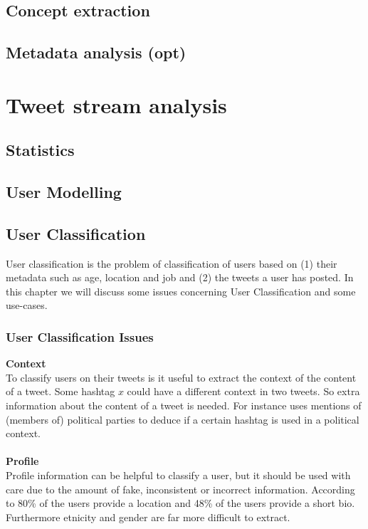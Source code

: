 \documentclass{article}
\begin{document}
\newpage
\subsection{Concept extraction}
\subsection{Metadata analysis (opt)}

\section{Tweet stream analysis}
\subsection{Statistics}
\subsection{User Modelling}
\subsection{User Classification}
User classification is the problem of classification of users based on (1) their metadata such as age, location and job and (2) the tweets a user has posted. In this chapter we will discuss some issues concerning User Classification and some use-cases. 

\subsubsection{User Classification Issues}
\textbf{Context}\\
To classify users on their tweets is it useful to extract the context of the content of a tweet. Some hashtag $x$ could have a different context in two tweets. So extra information about the content of a tweet is needed. For instance \cite{userclasst} uses mentions of (members of) political parties to deduce if a certain hashtag is used in a political context. 
\\\\
\textbf{Profile}\\
Profile information can be helpful to classify a user, but it should be used with care due to the amount of fake, inconsistent or incorrect information. According to \cite{usermachine} 80\% of the users provide a location and 48\% of the users provide a short bio. Furthermore etnicity and gender are far more difficult to extract. 
\end{document}
